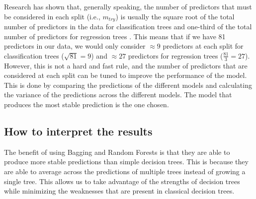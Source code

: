 Research has shown that, generally speaking, the number of predictors that must be considered in each split (i.e., $m_{try}$) is usually the square root of the total number of predictors in the data for classification trees and one-third of the total number of predictors for regression trees \citep{breimanRandomForests2001,sandriBiasCorrectionAlgorithm2008,hastieElementsStatisticalLearning2009,
janitzaOverestimationRandomForests2018,boehmkeHandsOnMachineLearning2019,jamesIntroductionStatisticalLearning2021}. This means that if we have 81 predictors in our data, we would only consider $\approx 9$ predictors at each split for classification trees ($\sqrt{81} = 9$) and $\approx 27$ predictors for regression trees ($\frac{81}{3} = 27$). However, this is not a hard and fast rule, and the number of predictors that are considered at each split can be tuned to improve the performance of the model. This is done by comparing the predictions of the different models and calculating the variance of the predictions across the different models. The model that produces the most stable prediction is the one chosen.

\subsection{How to interpret the results} \label{sec:random_forests_interpret}

The benefit of using Bagging and Random Forests is that they are able to produce more stable predictions than simple decision trees. This is because they are able to average across the predictions of multiple trees instead of growing a single tree. This allows us to take advantage of the strengths of decision trees while minimizing the weaknesses that are present in classical decision trees. 

